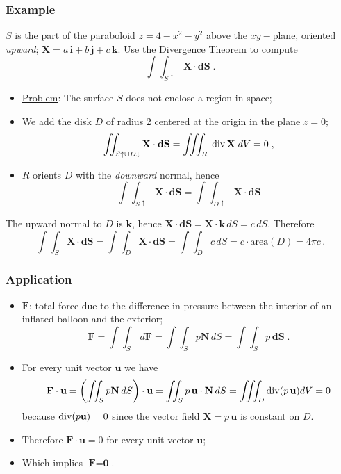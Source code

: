 \begin{frame}
  \frametitle{Example}

$S$ is the part of the paraboloid $z=4-x^2-y^2$ above the $xy-$plane, oriented \emph{upward}; $\textbf{X} = a\, \textbf{i} + b\, \textbf{j} + c\, \textbf{k}$. Use the Divergence Theorem to compute
%
$$\int\!\!\!\int_{S\uparrow} \textbf{X} \cdot \textbf{dS} \; .$$
%

\begin{itemize}
  \item \pause \underline{Problem}: The surface $S$ does not enclose a region in space;
  \item \pause We add the disk $D$ of radius 2 centered at the origin in the plane $z=0$;
$$\int\!\!\!\int_{S\uparrow \cup D\downarrow} \textbf{X} \cdot \textbf{dS} = \int\!\!\!\int\!\!\!\int_R\; \divg \textbf{X} \; dV = 0\; ,$$
%
\item \pause $R$ orients $D$ with the \emph{downward} normal, hence
%
$$\int\!\!\!\int_{S\uparrow} \textbf{X} \cdot \textbf{dS} = \int\!\!\!\int_{D\uparrow} \textbf{X} \cdot \textbf{dS}$$
%
\end{itemize}

\pause The upward normal to $D$ is $\textbf{k}$, hence $\textbf{X}\cdot \textbf{dS}= \textbf{X}\cdot \textbf{k} \, dS= c\,dS$. Therefore
%
$$\int\!\!\!\int_{S} \textbf{X} \cdot \textbf{dS} = \int\!\!\!\int_{D} \textbf{X} \cdot \textbf{dS} = \int\!\!\!\int_D c\, dS = c\cdot\text{area}(D) = 4\pi c\, .$$
\end{frame}

\begin{frame}
  \frametitle{Application}

\begin{itemize}
  \item \pause $\textbf{F}$: total force due to the difference in pressure between the interior of an inflated balloon and the exterior;
%
$$\bm{F} =  \int\!\!\!\int_S \, d\textbf{F} = \int\!\!\!\int_S p \textbf{N} \, dS = \int\!\!\!\int_S p\, \bm{dS} \; .$$
%
\item \pause For every unit vector $\textbf{u}$ we have
%
\begin{align*}
  \textbf{F} \cdot \textbf{u} = \left(\int\!\!\!\int_S p \textbf{N} \, dS \right) \cdot \textbf{u} = \int\!\!\!\int_S p\, \textbf{u} \cdot  \textbf{N} \, dS = \int\!\!\!\int\!\!\!\int_D \divg (p\, \textbf{u}) dV = 0
\end{align*}
%
because $\operatorname{div} (p \textbf{u}) = 0$ since the vector field $\textbf{X}= p\, \textbf{u}$ is constant on $D$.
\item Therefore $\textbf{F}\cdot \textbf{u} = 0$ for every unit vector $\textbf{u}$;
    \item \pause Which implies $\textbf{F}=\textbf{0}$.
\end{itemize}

\end{frame}

